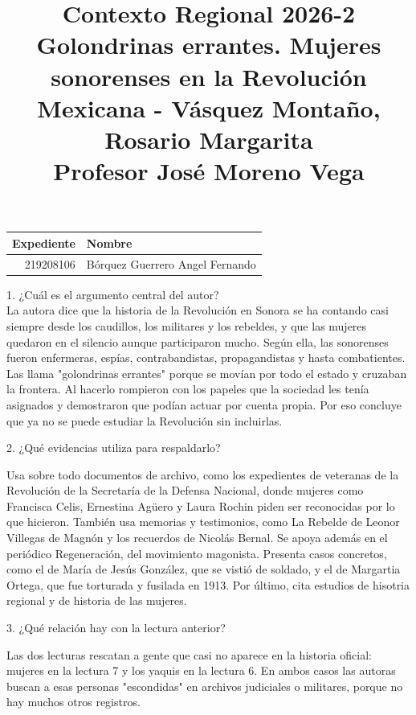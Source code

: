 \documentclass[a4paper, 11pt]{article}
\title
{
    Contexto Regional 2026-2 \\
    Golondrinas errantes. Mujeres sonorenses en la Revolución Mexicana - Vásquez Montaño, Rosario Margarita \\

    Profesor José Moreno Vega
}
\begin{document}
\begin{otherlanguage}{spanish}
\maketitle
\end{otherlanguage}

\begin{center}
    \begin{tabular}{r|l}
        \textbf{Expediente} & \textbf{Nombre} \\ \hline
        219208106 & Bórquez Guerrero Angel Fernando \\
    \end{tabular}
\end{center}

{\Large 1. ¿Cuál es el argumento central del autor?} \\
{\color{azul}
    La autora dice que la historia de la Revolución en Sonora se ha contando casi siempre desde los caudillos, los militares y los rebeldes, y que las mujeres quedaron en el silencio aunque participaron mucho. Según ella, las sonorenses fueron enfermeras, espías, contrabandistas, propagandistas y hasta combatientes. Las llama "golondrinas errantes" porque se movían por todo el estado y cruzaban la frontera. Al hacerlo rompieron con los papeles que la sociedad les tenía asignados y demostraron que podían actuar por cuenta propia. Por eso concluye que ya no se puede estudiar la Revolución sin incluirlas.
}
\vspace{1cm}

{\Large 2. ¿Qué evidencias utiliza para respaldarlo?} \par
{\color{azul}
Usa sobre todo documentos de archivo, como los expedientes de veteranas de la Revolución de la Secretaría de la Defensa Nacional, donde mujeres como Francisca Celis, Ernestina Agüero y Laura Rochin piden ser reconocidas por lo que hicieron. También usa memorias y testimonios, como La Rebelde de Leonor Villegas de Magnón y los recuerdos de Nicolás Bernal. Se apoya además en el periódico Regeneración, del movimiento magonista. Presenta casos concretos, como el de María de Jesús González, que se vistió de soldado, y el de Margartia Ortega, que fue torturada y fusilada en 1913. Por último, cita estudios de hisotria regional y de historia de las mujeres.
}
\vspace{1cm}

{\Large 3. ¿Qué relación hay con la lectura anterior?} \par
{\color{azul}
Las dos lecturas rescatan a gente que casi no aparece en la historia oficial: mujeres en la lectura 7 y los yaquis en la lectura 6. En ambos casos las autoras buscan a esas personas "escondidas" en archivos judiciales o militares, porque no hay muchos otros registros.
}
\end{document}
